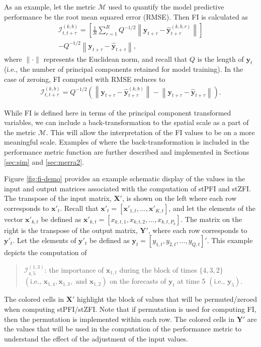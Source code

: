 \documentclass[AMS,STIX2COL]{WileyNJD-v2}
\newcommand\norm[1]{\lVert#1\rVert}
\begin{document}
As an example, let the metric $\mathcal{M}$ used to quantify the model predictive performance be the root mean squared error (RMSE). Then FI is calculated as
\begin{multline}
  \mathcal{I}^{(k,b)}_{t,t+\tau}=\left[\frac{1}{R}\sum_{r=1}^RQ^{-1/2}\left\lVert\textbf{y}_{t+\tau}-\hat{\textbf{y}}^{(k,b,r)}_{t+\tau}\right\rVert\right]\\-Q^{-1/2}\left\lVert\textbf{y}_{t+\tau}-\hat{\textbf{y}}_{t+\tau}\right\rVert,
\end{multline}
where $\norm{\cdot}$ represents the Euclidean norm, and recall that $Q$ is the length of $\textbf{y}_t$ (i.e., the number of principal components retained for model training). In the case of zeroing, FI computed with RMSE reduces to
\begin{align}
\mathcal{I}^{(k,b)}_{t,t+\tau}=Q^{-1/2}\left(\left\lVert\textbf{y}_{t+\tau}-\hat{\textbf{y}}^{(k,b)}_{t+\tau}\right\rVert-\left\lVert\textbf{y}_{t+\tau}-\hat{\textbf{y}}_{t+\tau}\right\rVert\right).
\end{align}

While FI is defined here in terms of the principal component transformed variables, we can include a back-transformation to the spatial scale as a part of the metric $\mathcal{M}$. This will allow the interpretation of the FI values to be on a more meaningful scale. Examples of where the back-transformation is included in the performance metric function are further described and implemented in Sections \ref{sec:sim} and \ref{sec:merra2}.

Figure \ref{fig:fi-demo} provides an example schematic display of the values in the input and output matrices associated with the computation of stPFI and stZFI. The transpose of the input matrix, $\textbf{X}'$, is shown on the left where each row corresponds to $\textbf{x}'_t$. Recall that $\textbf{x}'_t=[\textbf{x}'_{1,t},...,\textbf{x}'_{K,t}]$, and let the elements of the vector $\textbf{x}'_{k,t}$ be defined as $\textbf{x}'_{k,t}=[x_{k,t,1},x_{k,t,2},...,x_{k,t,P_k}]$. The matrix on the right is the transpose of the output matrix, $\textbf{Y}'$, where each row corresponds to $\textbf{y}'_t$. Let the elements of $\textbf{y}'_t$ be defined as $\textbf{y}_t=[y_{1,t}, y_{2,t},..., y_{Q,t}]'$. This example depicts the computation of
\begin{quote}
    $\mathcal{I}_{4,5}^{(1,3)}$: the importance of $\textbf{x}_{1,t}$ during the block of times $\{4,3,2\}$ $\left(\mbox{i.e., } \textbf{x}_{1,4}, \textbf{x}_{1,3}, \mbox{ and } \textbf{x}_{1,2}\right)$ on the forecasts of $\textbf{y}_{t}$ at time 5 $\left(\mbox{i.e., } \textbf{y}_5\right)$.
\end{quote}
The colored cells in $\textbf{X}'$ highlight the block of values that will be permuted/zeroed when computing stPFI/stZFI. Note that if permutation is used for computing FI, then the permutation is implemented within each row. The colored cells in $\textbf{Y}'$ are the values that will be used in the computation of the performance metric to understand the effect of the adjustment of the input values.
\end{document}
